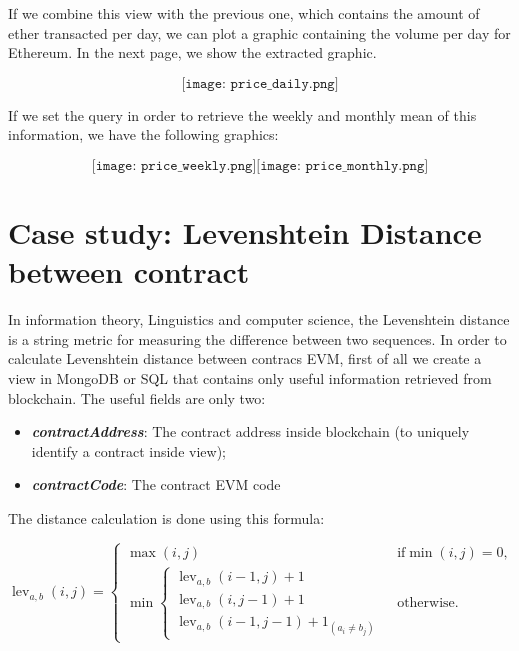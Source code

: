 If we combine this view with the previous one, which contains the amount of ether transacted per day, we can plot a graphic containing the volume per day for Ethereum. In the next page, we show the extracted graphic.
\begin{center}
    \[
        \texttt{[image: price\_daily.png]}
    \]
\end{center}
If we set the query in order to retrieve the weekly and monthly mean of this information, we have the following graphics:
\begin{center}
    \[
        \texttt{[image: price\_weekly.png]}
        \texttt{[image: price\_monthly.png]}
    \]
\end{center}
\section{Case study: Levenshtein Distance between contract}
In information theory, Linguistics and computer science, the Levenshtein distance is a string metric for measuring the difference between two sequences.
In order to calculate Levenshtein distance between contracs EVM, first of all we create a view in MongoDB or SQL that contains only useful information retrieved from blockchain.
The useful fields are only two:
\begin{itemize}
    \item \textit{\textbf{contractAddress}}: The contract address inside blockchain (to uniquely identify a contract inside view);
    \item \textit{\textbf{contractCode}}: The contract EVM code
\end{itemize}
The distance calculation is done using this formula:
\begin{center}
$\operatorname{lev}_{a,b}(i,j) = 
\begin{cases}
  \max(i,j) & \text{ if} \min(i,j)=0, \\
  \min \begin{cases}
      \operatorname{lev}_{a,b}(i-1,j) + 1 \\
      \operatorname{lev}_{a,b}(i,j-1) + 1 \\
      \operatorname{lev}_{a,b}(i-1,j-1) + 1_{(a_i \neq b_j)}
   \end{cases} & \text{ otherwise.}
\end{cases}
$
\end{center}



